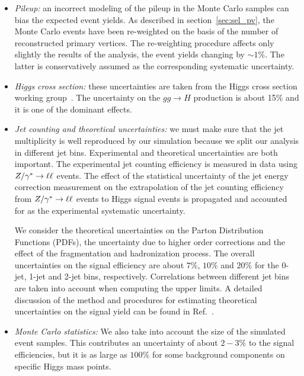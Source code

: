 \begin{itemize}
\item {\it Pileup:} an incorrect modeling of the pileup in the Monte Carlo samples 
can bias the expected event yields. As described in section~\ref{sec:sel_pv}, 
the Monte Carlo events have been re-weighted on the basis of the number of reconstructed
primary vertices. The re-weighting procedure affects only slightly the results of the analysis,
the event yields changing by $\sim1\%$. The latter is conservatively assumed as 
the corresponding systematic uncertainty. 

\item {\it Higgs cross section:} these uncertainties are taken from the Higgs cross
section working group~\cite{LHCHiggsCrossSectionWorkingGroup:2011ti}. The uncertainty 
on the $gg \to H$ production is about 15\% and it is one of the dominant effects.

\item {\it Jet counting and theoretical uncertainties:} 
we must make sure that the jet multiplicity is well reproduced by our 
simulation because we split our analysis in different jet bins. 
Experimental and theoretical uncertainties are both important.
The experimental jet counting efficiency is measured in data 
using $Z/\gamma^*\to\ell\ell$ events. The effect of the statistical uncertainty 
of the jet energy correction measurement on the extrapolation
of the jet counting efficiency from $Z/\gamma^*\to\ell\ell$ events to Higgs signal
events is propagated and accounted for as the experimental 
systematic uncertainty.

We consider the theoretical uncertainties on the Parton Distribution Functions (PDFs), 
the uncertainty due to higher order corrections and the effect of the fragmentation and 
hadronization process. The overall uncertainties on the signal efficiency are 
about $7\%$, $10\%$ and $20\%$ for the 0-jet, 1-jet and 2-jet bins, respectively.
Correlations between different jet bins are taken into account when computing
the upper limits. A detailed discussion of the method and procedures for estimating
theoretical uncertainties on the signal yield can be found in Ref.~\cite{HWW2011AN}. 


\item {\it Monte Carlo statistics:} We also take into account the 
size of the simulated event samples. 
This contributes an uncertainty of about $2-3\%$ to the signal
efficiencies, but it is as large as $100\%$ for some background components on specific
Higgs mass points.
\end{itemize}

